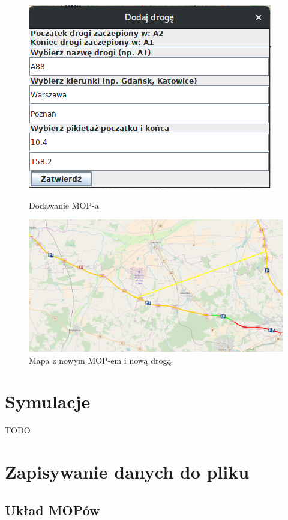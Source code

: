 \documentclass[10pt,paper=a4 BCOR0, DIV15, titlepage=false, oneside]{scrbook} %
\begin{document}
     \begin{figure}[ht]
       \begin{minipage}{.3\textwidth}
        \centering
       \includegraphics[width=.9\linewidth]{dodawanie_drogi.png}
        \caption{Dodawanie MOP-a}
      \end{minipage}%
      \begin{minipage}{.6\textwidth}
        \centering
       \includegraphics[width=.9\linewidth]{dodany_mop_droga.png}
        \caption{Mapa z nowym MOP-em i nową drogą}
      \end{minipage}
      \end{figure}


    \chapter*{Symulacje}
    \addtocounter{chapter}{1}
    \setcounter{section}{0}
    TODO

    \chapter*{Zapisywanie danych do pliku}
    \addtocounter{chapter}{1}
    \setcounter{section}{0}

    \section{Układ MOPów}

  
\end{document}
